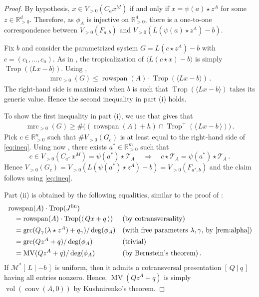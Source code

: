 \documentclass[11pt,reqno,a4paper]{amsart}
\numberwithin{equation}{section}
\theoremstyle{theoremstyle}
\theoremstyle{examplestyle}
\newcommand{\RR}{\mathbb{R}}
\newcommand{\lin}{{\mathrm{lin}}}
\DeclareMathOperator{\grc}{grc}
\DeclareMathOperator{\mrc}{mrc}
\DeclareMathOperator{\rowspan}{rowspan}
\DeclareMathOperator{\conv}{conv}
\DeclareMathOperator{\MV}{MV}
\DeclareMathOperator{\vol}{vol}
\DeclareMathOperator{\Trop}{Trop}
\begin{document}
\begin{proof}
By hypothesis, $x\in V_{>0}(C_a x^M)$ if and only if $x=\psi(a) \star z^A$ for some $z\in \RR^d_{>0}$. 
Therefore, as  $\phi_A$ is injective on $\RR^d_{>0}$, there is a one-to-one correspondence between $V_{>0}(F_{a,b})$ and $V_{>0}(L( \psi(a) \star z^A) - b)$. 

Fix $b$ and consider the  parametrized system
$G=L( c \star z^A) - b$ with $c=(c_1,\dots,c_{n})$. As in , the tropicalization of $\langle L( c \star x) - b \rangle $   is simply $\Trop(\langle L  x - b\rangle)$. 
Using , 
\begin{align*}
    \mrc_{>0}(G) 
    \leq  \rowspan(A)\cdot \Trop(\langle Lx-b\rangle)\, .
\end{align*}
The right-hand side is maximized when $b$ is such that $\Trop(\langle Lx-b\rangle)$ takes its generic value. Hence the second inequality in part (i) holds.  
 
To show the first inequality in part (i), we use that 
  gives that
\begin{align}\label{eq:ineq}
\mrc_{>0}(G)   \geq \# \big((\rowspan(A)+h)\cap \Trop^+(\langle\,Lx-b\,\rangle)\big)\,.
\end{align}
Pick $c\in \RR^n_{>0}$ such that $\# V_{>0}(G_{c})$ is at least equal to the right-hand side of \eqref{eq:ineq}. Using now , there exists  $a^*\in \RR^m_{>0}$ such that 
\[ c \in V_{>0}(C_{a^*}\, x^M) =\psi(a^*)\star\mathcal{T}_A \, \quad \Rightarrow \quad c\star\mathcal{T}_A =  \psi(a^*)\star\mathcal{T}_A\,. \]
Hence 
$V_{>0}(G_{c})    = V_{>0}(L(\psi(a^*) \star z^A)-b)  = V_{>0} (F_{a^*,b})$ and the claim follows using \eqref{eq:ineq}. 
 
 
Part (ii)  is obtained by the following equalities, similar to the proof of :
\begin{align*}
& \rowspan(A)\cdot \Trop(J^{\lin})\,    && 
\\ 
&\quad = \rowspan(A)\cdot  \Trop(\langle\, Q  x + q \,\rangle)  && \text{(by cotransversality)}  \\
&\quad = \grc(Q_\gamma (\lambda \star z^A) + q_\gamma   )  / \deg(\phi_A) && \text{(with free parameters $\lambda,\gamma$, by \Cref{rem:alpha})} \\ 
&\quad = \grc(Q  z^A + q   )  / \deg(\phi_A)   && \text{(trivial)}
\\ &\quad = \MV(Q z^A + q)/\deg(\phi_A) && \text{(by Bernstein's theorem)}\, . 
\end{align*}
If  $\mathcal{M}^*[\,L\mid -b\,]$ is uniform, then it admits a cotransversal presentation $[\,Q\ | \ q\,]$ having all entries nonzero. 
Hence,  $\MV(Qz^A+q)$ is simply $\vol(\conv(A,0))$ by Kushnirenko's theorem. 
\end{proof}
 
\end{document}
